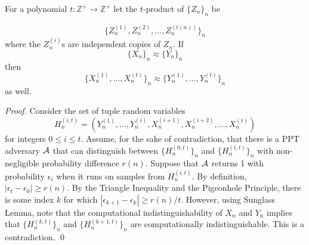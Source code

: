 \begin{lemma}
For a polynomial $t:\mathbb{Z}^+\rightarrow\mathbb{Z}^+$ let the $t$-product of $\{Z_n\}_n$ be

$$\{Z_n^{(1)}, Z_n^{(2)},\hdots, Z_n^{(t(n))}\}_n$$
where the $Z_n^{(i)}$s are independent copies of $Z_n$. If
$$\{X_n\}_n\approx\{Y_n\}_n$$
then
$$\{X_n^{(1)},\hdots,X_n^{(t)}\}_n\approx\{Y_n^{(1)},\hdots,Y_n^{(t)}\}_n$$
as well.
\end{lemma}

\begin{proof}
Consider the set of tuple random variables
$$H^{(i,t)}_n = (Y_n^{(1)},\hdots,Y_n^{(i)},X_n^{(i+1)},X_n^{(i+2)},\hdots,X_n^{(t)})$$
for integers $0\le i\le t$. Assume, for the sake of contradiction, that there is a PPT adversary $\mathcal{A}$ that can distinguish between $\{H^{(0,t)}_n\}_n$ and $\{H^{(t,t)}_n\}_n$ with non-negligible probability difference $r(n)$. Suppose that $\mathcal{A}$ returns 1 with probability $\epsilon_i$ when it runs on samples from $H^{(i,t)}_n$. By definition, $|\epsilon_t - \epsilon_0|\ge r(n)$. By the Triangle Inequality and the Pigeonhole Principle, there is some index $k$ for which
$|\epsilon_{k+1} - \epsilon_k|\ge r(n)/t$. However, using Sunglass Lemma, note that the computational indistinguishability of $X_n$ and $Y_n$ implies that $\{H^{(k,t)}_n\}_n$ and $\{H^{(k+1,t)}_n\}_n$ are computationally indistinguishable. This is a contradiction. 
\qed
%
%
\end{proof}


